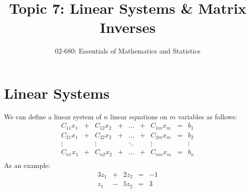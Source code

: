 


\title{Topic 7: Linear Systems \& Matrix Inverses}
\author{02-680: Essentials of Mathematics and Statistics}


\maketitle

\section{Linear Systems}
We can define a linear system of $n$ linear equations on $m$ variables as follows: 
\[\begin{array}{ccccccccc}
C_{11} x_1 & + & C_{12} x_2 & + & \hdots & + & C_{1m} x_m & = & b_1\\
C_{21} x_1 & + & C_{22} x_2 & + & \hdots & + & C_{2m} x_m & = & b_2\\
\vdots & & \vdots & & \ddots & & \vdots & & \vdots\\
C_{n1} x_1 & + & C_{n2} x_2 & + & \hdots & + & C_{nm} x_m & = & b_n\\
\end{array}\]
As an example: 
\[\begin{array}{rcrcr}
3 z_1 & + & 2 z_2 & = & -1\\
 z_1 & - & 5 z_2 & = & 3\\
\end{array}\]

